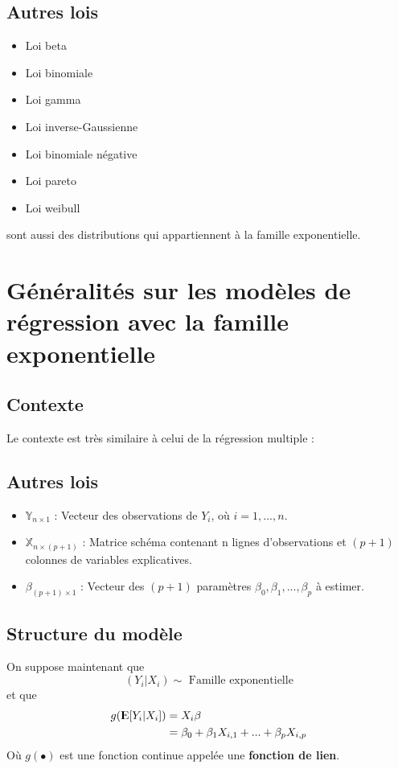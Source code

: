 \documentclass[11pt,french]{report}
\newcommand{\E}{{\rm I\kern-.3em E}}
\begin{document}
\subsection{Autres lois}
\begin{itemize}
\item Loi beta
\item Loi binomiale
\item Loi gamma
\item Loi inverse-Gaussienne
\item Loi binomiale négative
\item Loi pareto
\item Loi weibull
\end{itemize}

sont aussi des distributions qui appartiennent à la famille exponentielle.

\section{Généralités sur les modèles de régression avec la famille exponentielle}

\subsection{Contexte}
Le contexte est très similaire à celui de la régression multiple :
\subsection{Autres lois}
\begin{itemize}
\item $\mathbb{Y}_{n \times 1}$ : Vecteur des observations de $Y_i$, où $i = 1,...,n$.
\item $\mathbb{X}_{n \times (p+1)}$ : Matrice schéma contenant n lignes d'observations et $(p+1)$ colonnes de variables explicatives.
\item $\mathbb{\beta}_{(p+1) \times 1}$ : Vecteur des $(p+1)$ paramètres $\beta_0, \beta_1,...,\beta_p$ à estimer. 
\end{itemize}

\subsection{Structure du modèle}
On suppose maintenant que 
$$
(Y_i|X_i) \sim \text{ Famille exponentielle}
$$
et que
\begin{align*}
g(\E[Y_i|X_i]) &= X_i\beta \\
&= \beta_0 + \beta_1X_{i,1} + ... + \beta_pX_{i,p}\\
\end{align*}
Où $g(\bullet)$ est une fonction continue appelée une \textbf{fonction de lien}.
\end{document}
